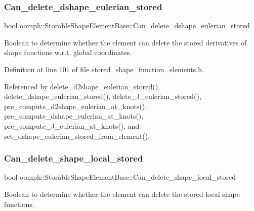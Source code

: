 \subsubsection{\texorpdfstring{Can\+\_\+delete\+\_\+dshape\+\_\+eulerian\+\_\+stored}{Can\_delete\_dshape\_eulerian\_stored}}
{\footnotesize\ttfamily bool oomph\+::\+Storable\+Shape\+Element\+Base\+::\+Can\+\_\+delete\+\_\+dshape\+\_\+eulerian\+\_\+stored\hspace{0.3cm}{\ttfamily [private]}}



Boolean to determine whether the element can delete the stored derivatives of shape functions w.\+r.\+t. global coordinates. 



Definition at line 101 of file stored\+\_\+shape\+\_\+function\+\_\+elements.\+h.



Referenced by delete\+\_\+d2shape\+\_\+eulerian\+\_\+stored(), delete\+\_\+dshape\+\_\+eulerian\+\_\+stored(), delete\+\_\+\+J\+\_\+eulerian\+\_\+stored(), pre\+\_\+compute\+\_\+d2shape\+\_\+eulerian\+\_\+at\+\_\+knots(), pre\+\_\+compute\+\_\+dshape\+\_\+eulerian\+\_\+at\+\_\+knots(), pre\+\_\+compute\+\_\+\+J\+\_\+eulerian\+\_\+at\+\_\+knots(), and set\+\_\+dshape\+\_\+eulerian\+\_\+stored\+\_\+from\+\_\+element().

\mbox{\label{classoomph_1_1StorableShapeElementBase_ad259ffc62869062699aa4e2050447522}} 
\subsubsection{\texorpdfstring{Can\+\_\+delete\+\_\+shape\+\_\+local\+\_\+stored}{Can\_delete\_shape\_local\_stored}}
{\footnotesize\ttfamily bool oomph\+::\+Storable\+Shape\+Element\+Base\+::\+Can\+\_\+delete\+\_\+shape\+\_\+local\+\_\+stored\hspace{0.3cm}{\ttfamily [private]}}



Boolean to determine whether the element can delete the stored local shape functions. 



